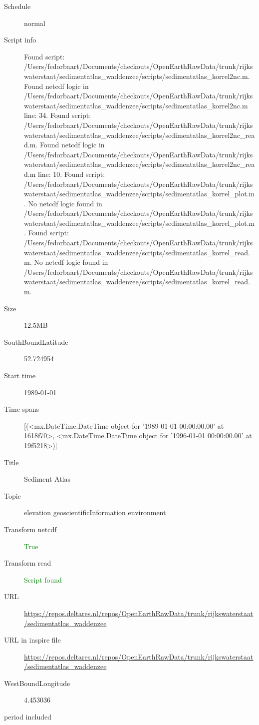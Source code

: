 \documentclass[9]{report}
\begin{document}
\begin{description}
\begin{verbatim}
\end{verbatim}
  \item[Schedule] normal
  \item[Script info] Found script: /Users/fedorbaart/Documents/checkouts/OpenEarthRawData/trunk/rijkswaterstaat/sedimentatlas\_waddenzee/scripts/sedimentatlas\_korrel2nc.m.
Found netcdf logic in /Users/fedorbaart/Documents/checkouts/OpenEarthRawData/trunk/rijkswaterstaat/sedimentatlas\_waddenzee/scripts/sedimentatlas\_korrel2nc.m line: 34.
Found script: /Users/fedorbaart/Documents/checkouts/OpenEarthRawData/trunk/rijkswaterstaat/sedimentatlas\_waddenzee/scripts/sedimentatlas\_korrel2nc\_read.m.
Found netcdf logic in /Users/fedorbaart/Documents/checkouts/OpenEarthRawData/trunk/rijkswaterstaat/sedimentatlas\_waddenzee/scripts/sedimentatlas\_korrel2nc\_read.m line: 10.
Found script: /Users/fedorbaart/Documents/checkouts/OpenEarthRawData/trunk/rijkswaterstaat/sedimentatlas\_waddenzee/scripts/sedimentatlas\_korrel\_plot.m.
No netcdf logic found in /Users/fedorbaart/Documents/checkouts/OpenEarthRawData/trunk/rijkswaterstaat/sedimentatlas\_waddenzee/scripts/sedimentatlas\_korrel\_plot.m.
Found script: /Users/fedorbaart/Documents/checkouts/OpenEarthRawData/trunk/rijkswaterstaat/sedimentatlas\_waddenzee/scripts/sedimentatlas\_korrel\_read.m.
No netcdf logic found in /Users/fedorbaart/Documents/checkouts/OpenEarthRawData/trunk/rijkswaterstaat/sedimentatlas\_waddenzee/scripts/sedimentatlas\_korrel\_read.m.
  \item[Size] 12.5MB
  \item[SouthBoundLatitude] 52.724954
  \item[Start time] 1989-01-01
  \item[Time spans] [(<mx.DateTime.DateTime object for '1989-01-01 00:00:00.00' at 1618f70>, <mx.DateTime.DateTime object for '1996-01-01 00:00:00.00' at 19f5218>)]
  \item[Title]  Sediment Atlas 
  \item[Topic] elevation geoscientificInformation environment
  \item[Transform netcdf] \textcolor{green}{True}
  \item[Transform read] \textcolor{green}{Script found}
  \item[URL] \href{https://repos.deltares.nl/repos/OpenEarthRawData/trunk/rijkswaterstaat/sedimentatlas\_waddenzee}{https://repos.deltares.nl/repos/OpenEarthRawData/trunk/rijkswaterstaat/sedimentatlas\_waddenzee}
  \item[URL in inspire file] \href{https://repos.deltares.nl/repos/OpenEarthRawData/trunk/rijkswaterstaat/sedimentatlas\_waddenzee}{https://repos.deltares.nl/repos/OpenEarthRawData/trunk/rijkswaterstaat/sedimentatlas\_waddenzee}
  \item[WestBoundLongitude] 4.453036
  \item[period included] 
\end{description}
\end{document}
